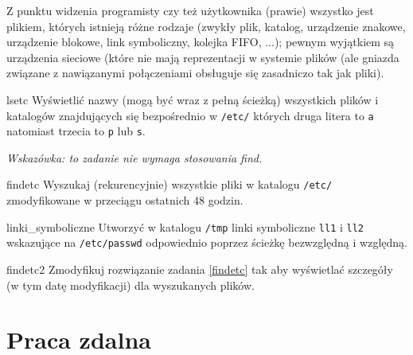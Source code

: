 \documentclass{pdfBooklets}
\begin{document}
Z punktu widzenia programisty czy też użytkownika (prawie) wszystko jest plikiem, których istnieją różne rodzaje (zwykły plik, katalog, urządzenie znakowe, urządzenie blokowe, link symboliczny, kolejka FIFO, ...); pewnym wyjątkiem są urządzenia sieciowe (które nie mają reprezentacji w systemie plików (ale gniazda związane z nawiązanymi połączeniami obsługuje się zasadniczo tak jak pliki).

\setcounter{subsection}{0} %

\begin{Zadanie}{}{lsetc}
Wyświetlić nazwy (mogą być wraz z pełną ścieżką) wszystkich plików i katalogów znajdujących się bezpośrednio w \texttt{/etc/} których druga litera to \texttt{a} natomiast trzecia to \texttt{p} lub \texttt{s}.

\emph{Wskazówka: to zadanie nie wymaga stosowania find.}
\end{Zadanie}

\begin{Zadanie}{}{findetc}
Wyszukaj (rekurencyjnie) wszystkie pliki w katalogu \texttt{/etc/} zmodyfikowane w przeciągu ostatnich 48 godzin.
\end{Zadanie}

\begin{Zadanie}{}{linki_symboliczne}
Utworzyć w katalogu \texttt{/tmp} linki symboliczne \texttt{ll1} i \texttt{ll2} wskazujące na \texttt{/etc/passwd} odpowiednio poprzez ścieżkę bezwzględną i względną.
\end{Zadanie}

\begin{Zadanie}{}{findetc2}
Zmodyfikuj rozwiązanie zadania \ref{findetc} tak aby wyświetlać szczegóły (w tym datę modyfikacji) dla wyszukanych plików.
\end{Zadanie}


\section{Praca zdalna}
\end{document}
